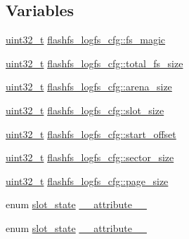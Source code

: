 \subsection*{Variables}
\begin{DoxyCompactItemize}
\item 
\hyperlink{stdint_8h_a435d1572bf3f880d55459d9805097f62}{uint32\-\_\-t} \hyperlink{group___p_i_o_s___f_l_a_s_h_f_s_ga1fe17f8582e422dfe871844653d7d6f9}{flashfs\-\_\-logfs\-\_\-cfg\-::fs\-\_\-magic}
\item 
\hyperlink{stdint_8h_a435d1572bf3f880d55459d9805097f62}{uint32\-\_\-t} \hyperlink{group___p_i_o_s___f_l_a_s_h_f_s_ga36ee534fa25bdd1bece22e997e3ba800}{flashfs\-\_\-logfs\-\_\-cfg\-::total\-\_\-fs\-\_\-size}
\item 
\hyperlink{stdint_8h_a435d1572bf3f880d55459d9805097f62}{uint32\-\_\-t} \hyperlink{group___p_i_o_s___f_l_a_s_h_f_s_ga838dc01d5c7c1796252597dbb2d1dc04}{flashfs\-\_\-logfs\-\_\-cfg\-::arena\-\_\-size}
\item 
\hyperlink{stdint_8h_a435d1572bf3f880d55459d9805097f62}{uint32\-\_\-t} \hyperlink{group___p_i_o_s___f_l_a_s_h_f_s_gac9f1463cfe49a3b517bf6c1e44bbb087}{flashfs\-\_\-logfs\-\_\-cfg\-::slot\-\_\-size}
\item 
\hyperlink{stdint_8h_a435d1572bf3f880d55459d9805097f62}{uint32\-\_\-t} \hyperlink{group___p_i_o_s___f_l_a_s_h_f_s_ga2a71336371b265bddac688b27ebcb94c}{flashfs\-\_\-logfs\-\_\-cfg\-::start\-\_\-offset}
\item 
\hyperlink{stdint_8h_a435d1572bf3f880d55459d9805097f62}{uint32\-\_\-t} \hyperlink{group___p_i_o_s___f_l_a_s_h_f_s_ga8251b6447774f97389ec08c71e1ed54b}{flashfs\-\_\-logfs\-\_\-cfg\-::sector\-\_\-size}
\item 
\hyperlink{stdint_8h_a435d1572bf3f880d55459d9805097f62}{uint32\-\_\-t} \hyperlink{group___p_i_o_s___f_l_a_s_h_f_s_ga28ddda808f37b1e0a2d6e8ea25c47c59}{flashfs\-\_\-logfs\-\_\-cfg\-::page\-\_\-size}
\item 
enum \hyperlink{group___p_i_o_s___f_l_a_s_h_f_s_ga7df58e5fca7cec32767a0481da453e74}{slot\-\_\-state} \hyperlink{group___p_i_o_s___f_l_a_s_h_f_s_ga4e3ec6cfc5003fc9b2421934fc31f43c}{\-\_\-\-\_\-attribute\-\_\-\-\_\-}
\item 
enum \hyperlink{group___p_i_o_s___f_l_a_s_h_f_s_ga7df58e5fca7cec32767a0481da453e74}{slot\-\_\-state} \hyperlink{group___p_i_o_s___f_l_a_s_h_f_s_ga4e3ec6cfc5003fc9b2421934fc31f43c}{\-\_\-\-\_\-attribute\-\_\-\-\_\-}
\end{DoxyCompactItemize}


